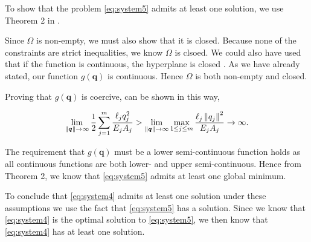 To show that the problem \eqref{eq:system5} admits at least one solution, we use Theorem 2 in \cite{optThe}.

Since $\Omega$ is non-empty, we must also show that it is closed. Because none of the constraints are strict inequalities, we know $\Omega$ is clsoed. We could also have used that if the function is continuous, the hyperplane is closed \cite{hyper}. As we have already stated, our function $g(\bm{q})$ is continuous. Hence $\Omega$ is both non-empty and closed.

Proving that $g(\bm{q})$ is coercive, can be shown in this way,

\begin{equation}
\lim_{\left\|\bm{q}\right\|\to\infty} \frac{1}{2}\sum_{j=1}^{m}\frac{\ell_{j}q_{j}^{2}}{E_{j}A_{j}} > 
\lim_{\left\|\bm{q}\right\|\to\infty} \max_{1 \leq j \leq m} \frac{\ell_{j}\left\|{q_{j}}\right\|^{2}}{E_{j}A_{j}} \rightarrow \infty.
\end{equation}

The requirement that $g(\bm{q})$ must be a lower semi-continuous function holds as all continuous functions are both lower- and upper semi-continuous. Hence from Theorem 2, we know that \eqref{eq:system5} admits at least one global minimum.

To conclude that \eqref{eq:system4} admits at least one solution under these assumptions we use the fact that \eqref{eq:system5} has a solution. Since we know that \eqref{eq:system4} is the optimal solution to \eqref{eq:system5}, we then know that \eqref{eq:system4} has at least one solution.